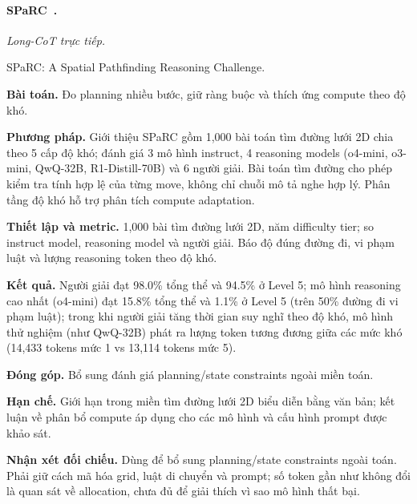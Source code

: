 \begin{samepage}
\paragraph{SPaRC~\cite{rra4_sparc}.}
\emph{Long-CoT trực tiếp.}\par
{\raggedright\noindent\small SPaRC: A Spatial Pathfinding Reasoning Challenge.\par}
\noindent\textbf{Bài toán.} Đo planning nhiều bước, giữ ràng buộc và thích ứng compute theo độ khó.\par
\end{samepage}
\noindent\textbf{Phương pháp.} Giới thiệu SPaRC gồm 1,000 bài toán tìm đường lưới 2D chia theo 5 cấp độ khó; đánh giá 3 mô hình instruct, 4 reasoning models (o4-mini, o3-mini, QwQ-32B, R1-Distill-70B) và 6 người giải. Bài toán tìm đường cho phép kiểm tra tính hợp lệ của từng move, không chỉ chuỗi mô tả nghe hợp lý. Phân tầng độ khó hỗ trợ phân tích compute adaptation.\par
\noindent\textbf{Thiết lập và metric.} 1,000 bài tìm đường lưới 2D, năm difficulty tier; so instruct model, reasoning model và người giải. Báo độ đúng đường đi, vi phạm luật và lượng reasoning token theo độ khó.\par
\noindent\textbf{Kết quả.} Người giải đạt 98.0\% tổng thể và 94.5\% ở Level 5; mô hình reasoning cao nhất (o4-mini) đạt 15.8\% tổng thể và 1.1\% ở Level 5 (trên 50\% đường đi vi phạm luật); trong khi người giải tăng thời gian suy nghĩ theo độ khó, mô hình thử nghiệm (như QwQ-32B) phát ra lượng token tương đương giữa các mức khó (14,433 tokens mức 1 vs 13,114 tokens mức 5).\par
\noindent\textbf{Đóng góp.} Bổ sung đánh giá planning/state constraints ngoài miền toán.\par
\noindent\textbf{Hạn chế.} Giới hạn trong miền tìm đường lưới 2D biểu diễn bằng văn bản; kết luận về phân bổ compute áp dụng cho các mô hình và cấu hình prompt được khảo sát.\par
\begin{samepage}
\noindent\textbf{Nhận xét đối chiếu.} Dùng để bổ sung planning/state constraints ngoài toán. Phải giữ cách mã hóa grid, luật di chuyển và prompt; số token gần như không đổi là quan sát về allocation, chưa đủ để giải thích vì sao mô hình thất bại.\par
{}
\end{samepage}


